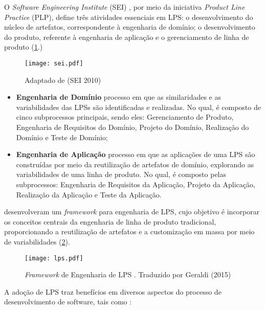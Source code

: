 O \textit{Software Engineering Institute} (SEI) \cite{sei2012}, por meio da iniciativa \textit{Product Line Practice} (PLP), define três atividades essenciais em LPS: o desenvolvimento do núcleo de artefatos, correspondente à engenharia de domínio; o desenvolvimento do produto, referente à engenharia de aplicação e o gerenciamento de linha de produto (\ref{fig:sei}.)

\begin{figure}[htb]
	\centering
	\texttt{[image: sei.pdf]}
	\caption{Adaptado de (SEI 2010) }
	\label{fig:sei}
\end{figure}

\begin{itemize}
	\item \textbf{Engenharia de Domínio} processo em que as similaridades e as variabilidades das LPSs são identificadas e realizadas. No qual, é composto de cinco subprocessos principais, sendo eles: Gerenciamento de Produto, Engenharia de Requisitos do Domínio, Projeto do Domínio, Realização do Domínio e Teste de Domínio;
	\item \textbf{Engenharia de Aplicação} processo em que as aplicações de uma LPS são construídas por meio da reutilização de artefatos de domínio, explorando as variabilidades de uma linha de produto. No qual, é composto pelas subprocessos: Engenharia de Requisitos da Aplicação, Projeto da Aplicação, Realização da Aplicação e Teste da Aplicação.
\end{itemize}

\cite{pohl2005software} desenvolveram um \textit{framework} para engenharia de LPS, cujo objetivo é incorporar os conceitos centrais da engenharia de linha de produto tradicional, proporcionando a reutilização de artefatos e a customização em massa por meio de variabilidades (\ref{fig:lps}).


\begin{figure}[htb]
	\centering
	\texttt{[image: lps.pdf]}
	\caption{\textit{Framework} de Engenharia de LPS \cite{pohl2005software}. Traduzido por Geraldi (2015)}
	\label{fig:lps}
\end{figure}

A adoção de LPS traz benefícios em diversos aspectos do processo de desenvolvimento de software, tais como \cite{linden2007product, pohl2005software}:

